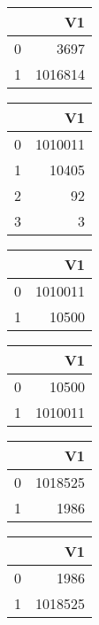 \bigskip\bigskip
\centering
\begin{tabular}{rr}
  \hline
 & V1 \\ 
  \hline
0 & 3697 \\ 
  1 & 1016814 \\ 
   \hline
\end{tabular}

\bigskip\bigskip
\centering
\begin{tabular}{rr}
  \hline
 & V1 \\ 
  \hline
0 & 1010011 \\ 
  1 & 10405 \\ 
  2 &  92 \\ 
  3 &   3 \\ 
   \hline
\end{tabular}

\bigskip\bigskip
\centering
\begin{tabular}{rr}
  \hline
 & V1 \\ 
  \hline
0 & 1010011 \\ 
  1 & 10500 \\ 
   \hline
\end{tabular}

\bigskip\bigskip
\centering
\begin{tabular}{rr}
  \hline
 & V1 \\ 
  \hline
0 & 10500 \\ 
  1 & 1010011 \\ 
   \hline
\end{tabular}

\bigskip\bigskip
\centering
\begin{tabular}{rr}
  \hline
 & V1 \\ 
  \hline
0 & 1018525 \\ 
  1 & 1986 \\ 
   \hline
\end{tabular}

\bigskip\bigskip
\centering
\begin{tabular}{rr}
  \hline
 & V1 \\ 
  \hline
0 & 1986 \\ 
  1 & 1018525 \\ 
   \hline
\end{tabular}

